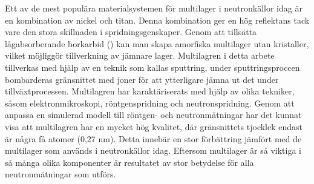 Ett av de mest populära materialsystemen för multilager i neutronkällor idag är en kombination av nickel och titan. Denna kombination ger en hög reflektans tack vare den stora skillnaden i spridningsgenskaper. Genom att tillsätta lågabsorberande borkarbid (\BC) kan man skapa amorfiska multilager utan kristaller, vilket möjliggör tillverkning av jämnare lager. Multilagren i detta arbete tillverkas med hjälp av en teknik som kallas sputtring, under sputtringsproccen bombarderas gränsnittet  med joner för att ytterligare jämna ut det under tillväxtprocessen. Multilagren har karaktäriserats med hjälp av olika tekniker, såsom elektronmikroskopi, röntgenspridning och neutronspridning. Genom att anpassa en simulerad modell till röntgen- och neutronmätningar har det kunnat visa att multilagren har en mycket hög kvalitet, där gränsnittets tjocklek endast är några få atomer (0,27 nm). Detta innebär en stor förbättring jämfört med de multilager som används i neutronkällor idag. Eftersom multilager är så viktiga i så många olika komponenter är resultatet av stor betydelse för alla neutronmätningar som utförs.